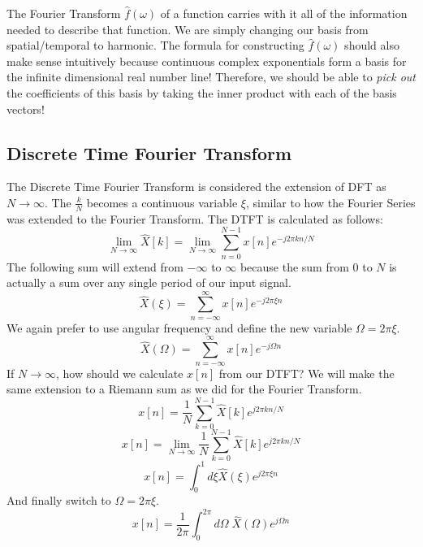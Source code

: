 \documentclass[a4paper]{article}
\numberwithin{equation}{section}
\begin{document}
The Fourier Transform $\hat{f}(\omega)$ of a function carries with it all of the information needed to describe that function. We are simply changing our basis from spatial/temporal to harmonic. The formula for constructing $\hat{f}(\omega)$ should also make sense intuitively because continuous complex exponentials form a basis for the infinite dimensional real number line! Therefore, we should be able to \textit{pick out} the coefficients of this basis by taking the inner product with each of the basis vectors! 

\subsection{Discrete Time Fourier Transform}
The Discrete Time Fourier Transform is considered the extension of DFT as $N\rightarrow \infty$. The $\frac{k}{N}$ becomes a continuous variable $\xi$, similar to how the Fourier Series was extended to the Fourier Transform. The DTFT is calculated as follows:
\begin{equation}
\lim_{N\rightarrow \infty}\hat{X}[k]=\lim_{N\rightarrow \infty}\sum_{n=0}^{N-1}x[n]e^{-j2\pi k n/N}
\end{equation}
The following sum will extend from $-\infty$ to $\infty$ because the sum from $0$ to $N$ is actually a sum over any single period of our input signal. 
\begin{equation}
\hat{X}(\xi)=\sum_{n=-\infty}^{\infty}x[n]e^{-j2\pi \xi n}
\end{equation}
We again prefer to use angular frequency and define the new variable $\Omega=2\pi \xi$. 
\begin{equation}\boxed{
\hat{X}(\Omega)=\sum_{n=-\infty}^{\infty}x[n]e^{-j\Omega n}}
\end{equation}
If $N\rightarrow \infty$, how should we calculate $x[n]$ from our DTFT? We will make the same extension to a Riemann sum as we did for the Fourier Transform. 
\begin{equation}
x[n]=\frac{1}{N}\sum_{k=0}^{N-1}\hat{X}[k]e^{j2\pi kn/N}
\end{equation}
\begin{equation}
x[n]=\lim_{N\rightarrow \infty}\frac{1}{N}\sum_{k=0}^{N-1}\hat{X}[k]e^{j2\pi kn/N}
\end{equation}
\begin{equation}
x[n]=\int_{0}^{1}d\xi \hat{X}(\xi)e^{j2\pi \xi n}
\end{equation}
And finally switch to $\Omega=2\pi \xi$.
\begin{equation}\boxed{
x[n]=\frac{1}{2\pi}\int_{0}^{2\pi}d\Omega\; \hat{X}(\Omega)e^{j\Omega n}}
\end{equation}
\end{document}
